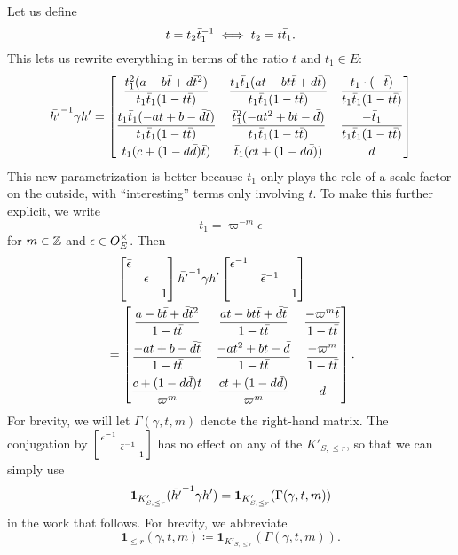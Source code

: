 Let us define
\[ t = t_2 \bar t_1 ^{-1} \iff t_2 = t \bar t_1. \]
This lets us rewrite everything in terms of the ratio $t$ and $t_1 \in E$:
\[
  \bar{h'} ^{-1} \gamma h'
  =
  \begin{bmatrix}
    \dfrac{t_1^2(a-b\bar t+\bar d \bar t^2)}{t_1 \bar t_1(1-t \bar t)}
    & \dfrac{t_1 \bar t_1(at-bt\bar t+\bar d \bar t)}{t_1 \bar t_1(1-t \bar t)}
    & \dfrac{t_1 \cdot (-\bar t)}{t_1 \bar t_1 (1-t \bar t)} \\[2ex]
    \dfrac{t_1\bar t_1(-at+b-\bar d \bar t)}{t_1 \bar t_1(1-t \bar t)}
    & \dfrac{\bar t_1^2(-at^2+bt-\bar d)}{t_1 \bar t_1(1-t \bar t)}
    & \dfrac{-\bar t_1}{t_1 \bar t_1(1-t \bar t)} \\[2ex]
    t_1(c + (1-d\bar d)\bar t) & \bar t_1(ct + (1-d \bar d)) & d
  \end{bmatrix}
\]
This new parametrization is better because $t_1$ only plays the role of
a scale factor on the outside, with ``interesting'' terms only involving $t$.
To make this further explicit, we write
\[ t_1 = \varpi^{-m} \epsilon \]
for $m \in \mathbb Z$ and $\epsilon \in O_E^\times$.
Then
\begin{align*}
  &\phantom=
  \begin{bmatrix} \bar\epsilon \\ & \epsilon \\ & & 1 \end{bmatrix}
  \bar{h'} \inv \gamma h'
  \begin{bmatrix} \epsilon\inv \\ & \bar\epsilon\inv \\ & & 1 \end{bmatrix} \\
  &=
  \begin{bmatrix}
  \dfrac{a-b\bar t+\bar d \bar t^2}{1-t \bar t}
  & \dfrac{at-bt\bar t+\bar d \bar t}{1-t \bar t}
  & \dfrac{-\varpi^m \bar t}{1-t \bar t} \\[2ex]
  \dfrac{-at+b-\bar d \bar t}{1-t \bar t}
  & \dfrac{-at^2+bt-\bar d}{1-t \bar t}
  & \dfrac{-\varpi^m}{1-t \bar t} \\[2ex]
  \dfrac{c + (1-d\bar d)\bar t}{\varpi^m} & \dfrac{ct + (1-d \bar d)}{\varpi^m} & d
  \end{bmatrix}.
\end{align*}
For brevity, we will let $\Gamma(\gamma, t, m)$ denote the right-hand matrix.
The conjugation by
$\left[ \begin{smallmatrix} \epsilon^{-1} \\ & \bar\epsilon^{-1} \\ & & 1 \end{smallmatrix} \right]$
has no effect on any of the $K'_{S, \le r}$, so that we can simply use
\[ \mathbf{1}_{K'_{S, \le r}}(\bar{h'}^{-1} \gamma h') = \mathbf{1}_{K'_{S, \le r}}(\Gamma(\gamma, t, m)) \]
in the work that follows.
For brevity, we abbreviate
\[ \mathbf{1}_{\le r}(\gamma, t, m) \coloneqq \mathbf{1}_{K'_{S, \le r}}(\Gamma(\gamma, t, m)). \]

